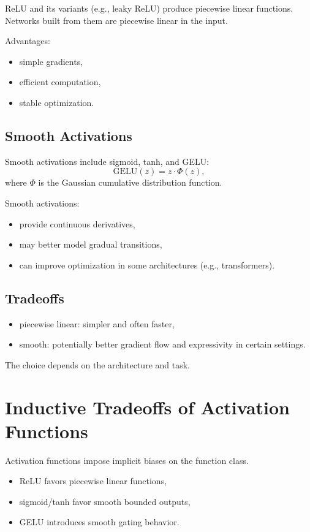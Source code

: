 ReLU and its variants (e.g., leaky ReLU) produce piecewise linear functions. Networks built from them are piecewise linear in the input.

Advantages:
\begin{itemize}
    \item simple gradients,
    \item efficient computation,
    \item stable optimization.
\end{itemize}

\subsection{Smooth Activations}

Smooth activations include sigmoid, tanh, and GELU:
\[
\mathrm{GELU}(z)=z \cdot \Phi(z),
\]
where $\Phi$ is the Gaussian cumulative distribution function.

Smooth activations:
\begin{itemize}
    \item provide continuous derivatives,
    \item may better model gradual transitions,
    \item can improve optimization in some architectures (e.g., transformers).
\end{itemize}

\subsection{Tradeoffs}

\begin{itemize}
    \item piecewise linear: simpler and often faster,
    \item smooth: potentially better gradient flow and expressivity in certain settings.
\end{itemize}

The choice depends on the architecture and task.

\section{Inductive Tradeoffs of Activation Functions}

Activation functions impose implicit biases on the function class.

\begin{itemize}
    \item ReLU favors piecewise linear functions,
    \item sigmoid/tanh favor smooth bounded outputs,
    \item GELU introduces smooth gating behavior.
\end{itemize}

